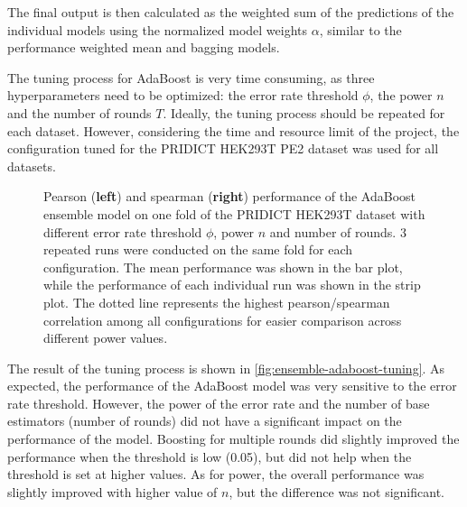 The final output is then calculated as the weighted sum of the predictions of the individual models using the normalized model weights $\alpha$, similar to the performance weighted mean and bagging models.

The tuning process for AdaBoost is very time consuming, as three hyperparameters need to be optimized: the error rate threshold $\phi$, the power $n$ and the number of rounds $T$.
Ideally, the tuning process should be repeated for each dataset. However, considering the time and resource limit of the project, the configuration tuned for the PRIDICT HEK293T PE2 dataset was used for all datasets. 

\begin{figure}
    \centering
    \caption[AdaBoost Tuning]{
        Pearson (\textbf{left}) and spearman (\textbf{right}) performance of the AdaBoost ensemble model on one fold of the PRIDICT HEK293T dataset with different error rate threshold $\phi$, power $n$ and number of rounds. 3 repeated runs were conducted on the same fold for each configuration. The mean performance was shown in the bar plot, while the performance of each individual run was shown in the strip plot. The dotted line represents the highest pearson/spearman correlation among all configurations for easier comparison across different power values. 
    }
    \label{fig:ensemble-adaboost-tuning}
\end{figure}

The result of the tuning process is shown in \autoref{fig:ensemble-adaboost-tuning}. As expected, the performance of the AdaBoost model was very sensitive to the error rate threshold. However, the power of the error rate and the number of base estimators (number of rounds) did not have a significant impact on the performance of the model. Boosting for multiple rounds did slightly improved the performance when the threshold is low (0.05), but did not help when the threshold is set at higher values. As for power, the overall performance was slightly improved with higher value of $n$, but the difference was not significant.

